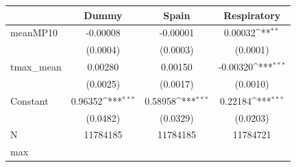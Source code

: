 {
\def\sym#1{\ifmmode^{#1}\else\(^{#1}\)\fi}
\begin{tabular}{l*{3}{c}}
\toprule
            &\multicolumn{1}{c}{Dummy}&\multicolumn{1}{c}{Spain}&\multicolumn{1}{c}{Respiratory}\\
\midrule
meanMP10    &    -0.00008         &    -0.00001         &     0.00032\sym{**} \\
            &    (0.0004)         &    (0.0003)         &    (0.0001)         \\
tmax\_mean   &     0.00280         &     0.00150         &    -0.00320\sym{***}\\
            &    (0.0025)         &    (0.0017)         &    (0.0010)         \\
Constant    &     0.96352\sym{***}&     0.58958\sym{***}&     0.22184\sym{***}\\
            &    (0.0482)         &    (0.0329)         &    (0.0203)         \\
\midrule
N           &    11784185         &    11784185         &    11784721         \\
max         &                     &                     &                     \\
\bottomrule
\end{tabular}
}
